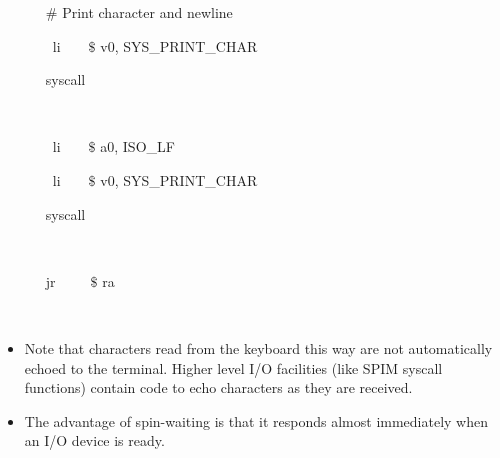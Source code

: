 \documentclass[12pt]{article}
\begin{document}
\begin{itemize}
{\fontsize{10pt}{12.0pt}\selectfont  \tabto{0.64in} \ \ \  $\#$  Print character and newline\par}\par

{\fontsize{10pt}{12.0pt}\selectfont  \tabto{0.64in} \ \ \ \ li\ \ \ \   $\$$ v0, SYS\_PRINT\_CHAR\par}\par

{\fontsize{10pt}{12.0pt}\selectfont  \tabto{0.64in} \ \ \  syscall\par}\par

{\fontsize{10pt}{12.0pt}\selectfont  \tabto{0.64in} \ \ \  \par}\par

{\fontsize{10pt}{12.0pt}\selectfont  \tabto{0.64in} \ \ \ \ li\ \ \ \   $\$$ a0, ISO\_LF\par}\par

{\fontsize{10pt}{12.0pt}\selectfont  \tabto{0.64in} \ \ \ \ li\ \ \ \   $\$$ v0, SYS\_PRINT\_CHAR\par}\par

{\fontsize{10pt}{12.0pt}\selectfont  \tabto{0.64in} \ \ \  syscall\par}\par

{\fontsize{10pt}{12.0pt}\selectfont  \tabto{0.64in} \ \ \  \par}\par

{\fontsize{10pt}{12.0pt}\selectfont  \tabto{0.64in} \ \ \  jr\ \ \ \ \  $\$$ ra\par}\par

{\fontsize{10pt}{12.0pt}\selectfont  \tabto{0.64in} \ \ \  \par}\par

\setlength{\parskip}{5.04pt}
	\item {\fontsize{13pt}{15.6pt}\selectfont Note that characters read from the keyboard this way are not automatically echoed to the terminal. Higher level I/O facilities (like SPIM syscall functions) contain code to echo characters as they are received.\par}\par

	\item {\fontsize{13pt}{15.6pt}\selectfont The advantage of spin-waiting is that it responds almost immediately when an I/O device is ready.\par}\par


\end{itemize}
\end{document}
